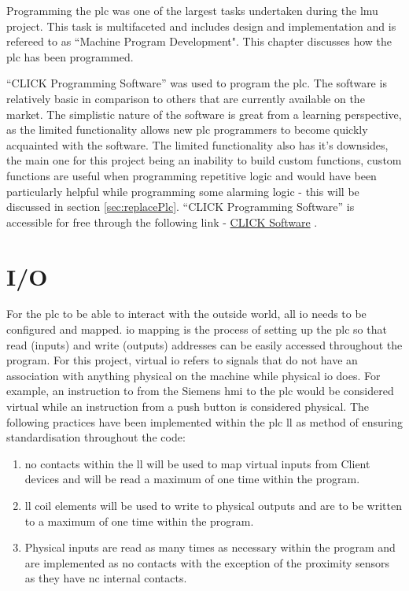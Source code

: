 Programming the \acrshort{plc} was one of the largest tasks undertaken during the \acrshort{lmu} project. This task is multifaceted and includes design and implementation and is refereed to as ``Machine Program Development". This chapter discusses how the \acrshort{plc} has been programmed.

``CLICK Programming Software'' was used to program the \acrshort{plc}. The software is relatively basic in comparison to others that are currently available on the market. The simplistic nature of the software is great from a learning perspective, as the limited functionality allows new \acrshort{plc} programmers to become quickly acquainted with the software. The limited functionality also has it's downsides, the main one for this project being an inability to build custom functions, custom functions are useful when programming repetitive logic and would have been particularly helpful while programming some alarming logic - this will be discussed in section \ref{sec:replacePlc}. ``CLICK Programming Software'' is accessible for free through the following link - \href{https://www.automationdirect.com/clickplcs/free-software/free-click-software}{CLICK Software} \cite{clickSoftwareDownload}.


\section{I/O}
    For the \acrshort{plc} to be able to interact with the outside world, all \acrshort{io} needs to be configured and mapped. \acrshort{io} mapping is the process of setting up the \acrshort{plc} so that read (inputs) and write (outputs) addresses can be easily accessed throughout the program. 
    For this project, virtual \acrshort{io} refers to signals that do not have an association with anything physical on the machine while physical \acrshort{io} does. For example, an instruction to from the Siemens \acrshort{hmi} to the \acrshort{plc} would be considered virtual while an instruction from a push button is considered physical. The following practices have been implemented within the \acrshort{plc} \acrshort{ll} as method of ensuring standardisation throughout the code:
    
    \begin{enumerate}
        \item \acrshort{no} contacts within the \acrshort{ll} will be used to map virtual inputs from Client devices and will be read a maximum of one time within the program.
        \item \acrshort{ll} coil elements will be used to write to physical outputs and are to be written to a maximum of one time within the program. 
        \item Physical inputs are read as many times as necessary within the program and are implemented as \acrshort{no} contacts with the exception of the proximity sensors as they have \acrshort{nc} internal contacts. 
    \end{enumerate}

